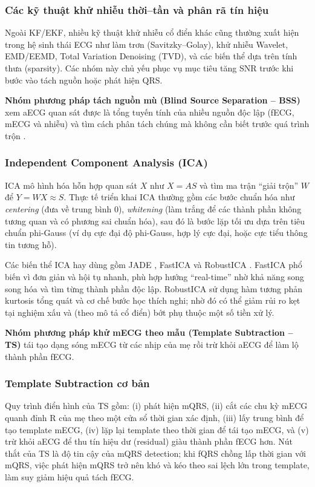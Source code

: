 \documentclass[../DoAn.tex]{subfiles}
\begin{document}
\subsubsection{Các kỹ thuật khử nhiễu thời--tần và phân rã tín hiệu}
Ngoài KF/EKF, nhiều kỹ thuật khử nhiễu cổ điển khác cũng thường xuất hiện trong hệ sinh thái ECG như làm trơn (Savitzky--Golay), khử nhiễu Wavelet, EMD/EEMD, Total Variation Denoising (TVD), và các biến thể dựa trên tính thưa (sparsity). Các nhóm này chủ yếu phục vụ mục tiêu tăng SNR trước khi bước vào tách nguồn hoặc phát hiện QRS.

\textbf{Nhóm phương pháp tách nguồn mù (Blind Source Separation -- BSS)} xem aECG quan sát được là tổng tuyến tính của nhiều nguồn độc lập (fECG, mECG và nhiễu) và tìm cách phân tách chúng mà không cần biết trước quá trình trộn \cite{cardosoBlindSignalSeparation1998}.

\subsubsection{Independent Component Analysis (ICA)}
ICA mô hình hóa hỗn hợp quan sát $X$ như $X = AS$ và tìm ma trận “giải trộn” $W$ để $Y = WX \approx S$. Thực tế triển khai ICA thường gồm các bước chuẩn hóa như \textit{centering} (đưa về trung bình 0), \textit{whitening} (làm trắng để các thành phần không tương quan và có phương sai chuẩn hóa), sau đó là bước lặp tối ưu dựa trên tiêu chuẩn phi-Gauss (ví dụ cực đại độ phi-Gauss, hợp lý cực đại, hoặc cực tiểu thông tin tương hỗ).

Các biến thể ICA hay dùng gồm JADE \cite{cardosoBlindBeamformingNongaussian1993}, FastICA \cite{hyvarinenIndependentComponentAnalysis2000} và RobustICA \cite{zarzosoRobustIndependentComponent2010}. FastICA phổ biến vì đơn giản và hội tụ nhanh, phù hợp hướng “real-time” nhờ khả năng song song hóa và tìm từng thành phần độc lập. RobustICA sử dụng hàm tương phản kurtosis tổng quát và cơ chế bước học thích nghi; nhờ đó có thể giảm rủi ro kẹt tại nghiệm xấu và (theo mô tả cổ điển) bớt phụ thuộc một số tiền xử lý.

\textbf{Nhóm phương pháp khử mECG theo mẫu (Template Subtraction -- TS)} tái tạo dạng sóng mECG từ các nhịp của mẹ rồi trừ khỏi aECG để làm lộ thành phần fECG.

\subsubsection{Template Subtraction cơ bản}
Quy trình điển hình của TS gồm: (i) phát hiện mQRS, (ii) cắt các chu kỳ mECG quanh đỉnh R của mẹ theo một cửa sổ thời gian xác định, (iii) lấy trung bình để tạo template mECG, (iv) lặp lại template theo thời gian để tái tạo mECG, và (v) trừ khỏi aECG để thu tín hiệu dư (residual) giàu thành phần fECG hơn. Nút thắt của TS là độ tin cậy của mQRS detection; khi fQRS chồng lấp thời gian với mQRS, việc phát hiện mQRS trở nên khó và kéo theo sai lệch lớn trong template, làm suy giảm hiệu quả tách fECG.
\end{document}
